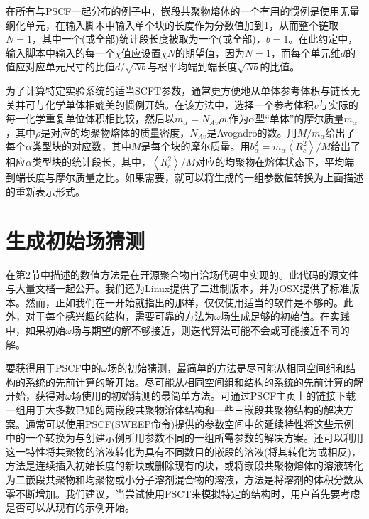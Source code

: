\documentclass[12pt,a4paper]{article}
\begin{document}
在所有与PSCF一起分布的例子中，嵌段共聚物熔体的一个有用的惯例是使用无量纲化单元，在输入脚本中输入单个块的长度作为分数值加到1，从而整个链取$N=1$，其中一个(或全部)统计段长度被取为一个(或全部)，$b=1$。在此约定中，输入脚本中输入的每一个$\chi$值应设置$\chi N$的期望值，因为$N=1$，而每个单元维$d$的值应对应单元尺寸的比值$d/\sqrt{Nb}$与根平均端到端长度$\sqrt{Nb}$的比值。

为了计算特定实验系统的适当SCFT参数，通常更方便地从单体参考体积与链长无关并可与化学单体相媲美的惯例开始。在该方法中，选择一个参考体积$v$与实际的每一化学重复单位体积相比较，然后以$m_{\alpha}=N_{Av}\rho v$作为$\alpha$型“单体”的摩尔质量$m_{\alpha}$，其中$\rho$是对应的均聚物熔体的质量密度，$N_{Av}$是Avogadro的数。用$M/m_{\alpha}$给出了每个$\alpha$类型块的对应数，其中$M$是每个块的摩尔质量。用$b_{\alpha}^2=m_{\alpha}\left\langle R_c^2 \right\rangle/M $给出了相应$\alpha$类型块的统计段长，其中，$\left\langle R_c^2 \right\rangle/M$对应的均聚物在熔体状态下，平均端到端长度与摩尔质量之比。如果需要，就可以将生成的一组参数值转换为上面描述的重新表示形式。\\
\section{生成初始场猜测}
在第2节中描述的数值方法是在开源聚合物自洽场代码中实现的。此代码的源文件与大量文档一起公开。我们还为Linux提供了二进制版本，并为OSX提供了标准版本。然而，正如我们在一开始就指出的那样，仅仅使用适当的软件是不够的。此外，对于每个感兴趣的结构，需要可靠的方法为$\omega$场生成足够的初始值。在实践中，如果初始$\omega$场与期望的解不够接近，则迭代算法可能不会或可能接近不同的解。

要获得用于PSCF中的$\omega$场的初始猜测，最简单的方法是尽可能从相同空间组和结构的系统的先前计算的解开始。尽可能从相同空间组和结构的系统的先前计算的解开始，获得对$\omega$场使用的初始猜测的最简单方法。可通过PSCF主页上的链接下载一组用于大多数已知的两嵌段共聚物溶体结构和一些三嵌段共聚物结构的解决方案。通常可以使用PSCF(SWEEP命令)提供的参数空间中的延续特性将这些示例中的一个转换为与创建示例所用参数不同的一组所需参数的解决方案。还可以利用这一特性将共聚物的溶液转化为具有不同数目的嵌段的溶液(将其转化为或相反)，方法是连续插入初始长度的新块或删除现有的块，或将嵌段共聚物熔体的溶液转化为二嵌段共聚物和均聚物或小分子溶剂混合物的溶液，方法是将溶剂的体积分数从零不断增加。我们建议，当尝试使用PSCT来模拟特定的结构时，用户首先要考虑是否可以从现有的示例开始。
\end{document}
